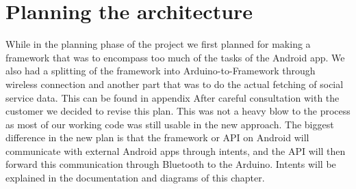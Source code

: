 \section{Planning the architecture}

While in the planning phase of the project we first planned for making a framework that was to encompass too much of the tasks of the Android app. We also had a splitting of the framework into Arduino-to-Framework through wireless connection and another part that was to do the actual fetching of social service data. This can be found in appendix %
After careful consultation with the customer we decided to revise this plan. This was not a heavy blow to the process as most of our working code was still usable in the new approach. The biggest difference in the new plan is that the framework or API on Android will communicate with external Android apps through intents, and the API will then forward this communication through Bluetooth to the Arduino. Intents will be explained in the documentation and diagrams of this chapter.
